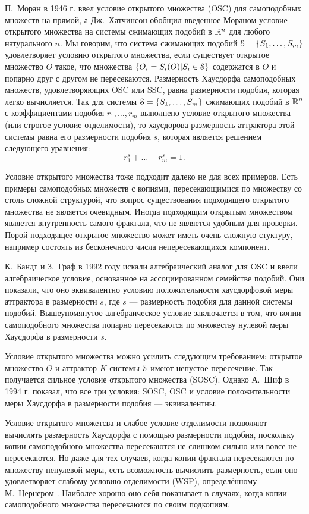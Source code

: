 П.~Моран в 1946 г. \cite{Moran} ввел условие открытого множества (OSC) для самоподобных множеств на прямой, а Дж.~Хатчинсон \cite{Hut} обобщил введенное Мораном условие открытого множества на системы сжимающих подобий в $\mathbb{R}^n$ для любого натурального $n$.
Мы говорим, что система сжимающих подобий ${\EuScript S}=\{S_1, \ldots, S_m\}$ удовлетворяет условию открытого множества, если существует открытое множество $O$ такое, что множества $\{O_i=S_i(O) | S_i\in{\EuScript S}\}$ содержатся в $O$ и попарно друг с другом не пересекаются.
Размерность Хаусдорфа самоподобных множеств, удовлетворяющих OSC или SSC, равна размерности подобия, которая легко вычисляется.
Так для системы ${\EuScript S}=\{S_1,\ldots,S_m\}$ сжимающих подобий в $\mathbb{R}^n$ с коэффициентами подобия $r_1, \ldots, r_m$ выполнено условие открытого множества (или строгое условие отделимости), то хаусдорова размерность  аттрактора этой системы равна его размерности подобия $s$, которая является решением следующего уравнения: $$r_1^s+\ldots+r_m^s=1.$$ 

Условие открытого множества тоже подходит далеко не для всех примеров.
Есть примеры самоподобных множеств с копиями, пересекающимися по множеству со столь сложной структурой, что вопрос существования подходящего открытого множества не является очевидным.
Иногда подходящим открытым множеством является внутренность самого фрактала, что не является удобным для проверки. 
Порой подходящее открытое множество может иметь очень сложную стуктуру, например состоять из бесконечного числа непересекающихся компонент.

К.~Бандт и З.~Граф в 1992 году \cite{SSS7} искали алгебраический аналог для OSC и ввели алгебраическое условие, основанное на ассоциированном семействе подобий. 
Они показали, что оно эквивалентно условию положительности хаусдорфовой меры аттрактора в размерности $s$, где $s$ --- размерность подобия для данной системы подобий.
Вышеупомянутое алгебраическое условие заключается в том, что копии самоподобного множества попарно пересекаются по множеству нулевой меры Хаусдорфа в размерности $s$.

Условие открытого множества можно усилить следующим требованием: открытое множество $O$ и аттрактор $K$ системы ${\EuScript S}$ имеют непустое пересечение. 
Так получается сильное условие открытого множества (SOSC).
Однако А.~Шиф \cite{Schi} в 1994 г. показал, что все три условия: SOSC, OSC и условие положительности меры Хаусдорфа в размерности подобия --- эквивалентны.

Условие открытого множетсва и слабое условие отделимости позволяют вычислять размерность Хаусдорфа с помощью размерности подобия, поскольку копии самоподобного множества пересекаются не слишком сильно или вовсе не пересекаются.
Но даже для тех случаев, когда копии фрактала пересекаются по множеству ненулевой меры, есть возможность вычислить размерность, если оно удовлетворяет  слабому условию отделимости (WSP), определённому М.~Цернером \cite{Zerner}.
Наиболее хорошо оно себя показывает в случаях, когда копии самоподобного множества пересекаются по своим подкопиям.

